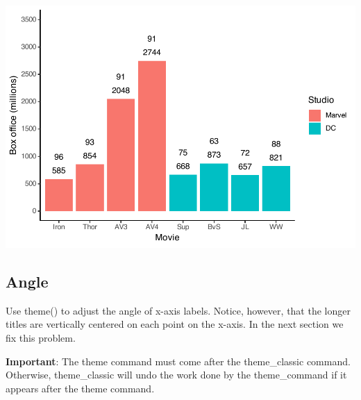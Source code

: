 \documentclass[
]{krantz}
\begin{document}
\includegraphics[width=0.65\linewidth]{bookdown_files/figure-latex/unnamed-chunk-123-1}

\hypertarget{angle}{%
\subsection{Angle}\label{angle}}

Use theme() to adjust the angle of x-axis labels. Notice, however, that the longer titles are vertically centered on each point on the x-axis. In the next section we fix this problem.

\textbf{Important}: The theme command must come after the theme\_classic command. Otherwise, theme\_classic will undo the work done by the theme\_command if it appears after the theme command.
\end{document}
